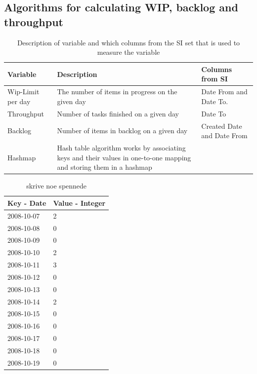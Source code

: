 \documentclass[UKenglish]{ifimaster}  %
\begin{document}
\subsection {Algorithms for calculating WIP, backlog and throughput}
\begin{table}[ht]
\begin{center}
    \begin{tabular}{| l | l | p{5cm} |}
    \hline
    Variable &	Description	 & Columns from SI\\ \hline 
    Wip-Limit per day & \parbox[t]{5cm}{The number of items in progress on the given day} & Date From and Date To. \\ \hline
    Throughput	& Number of tasks finished on a given day & Date To \\ \hline
    Backlog & Number of items in backlog on a given day & Created Date and Date From\\ \hline
 Hashmap &\parbox[t]{7cm}{Hash table algorithm works by associating keys and their values in one-to-one mapping and storing them in a hashmap \parencite{Hashmap}} & \\ \hline
\end{tabular}
\caption{Description of variable and which columns from the SI set that is used to measure the variable}
\label{des} %
\end{center}
\end{table}

\begin{table}[ht]
\begin{center}
    \begin{tabular}{| l | p{5cm} |}
    \hline
     Key - Date  & Value - Integer\\ \hline
     2008-10-07 & 2   \\ \hline
     2008-10-08 & 0   \\ \hline
     2008-10-09 & 0   \\ \hline
     2008-10-10 & 2   \\ \hline
     2008-10-11 & 3   \\ \hline
     2008-10-12 & 0   \\ \hline
     2008-10-13 & 0   \\ \hline
     2008-10-14 & 2   \\ \hline
     2008-10-15 & 0   \\ \hline
     2008-10-16 & 0   \\ \hline
     2008-10-17 & 0   \\ \hline
     2008-10-18 & 0   \\ \hline
     2008-10-19 & 0   \\ \hline
    \end{tabular}
\caption{skrive noe spennede}
\label{IC} %
\end{center}
\end{table}
\end{document}
